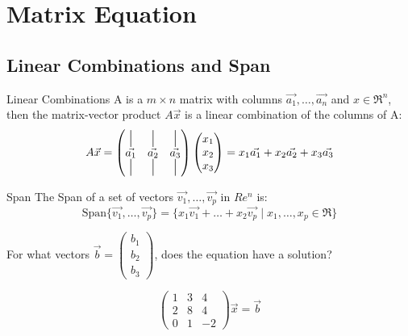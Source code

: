 \section{Matrix Equation}
\subsection{Linear Combinations and Span}
\begin{definition}
    Linear Combinations
    \newline
    A is a \(m\times n\) matrix with columns \(\Vec{a_1}, \dots, \Vec{a_n}\) and \(x\in \Re^n\), then the matrix-vector product \(A\Vec{x}\) is a linear combination of the columns of A:
    \begin{equation}
        A\Vec{x} = 
        \begin{pmatrix}
            \spike{15pt}{$\Vec{a_1}$}  & \spike{15pt}{$\Vec{a_2}$} & \spike{15pt}{$\Vec{a_3}$}
        \end{pmatrix}
        \begin{pmatrix}
            x_1 \\
            x_2 \\
            x_3
        \end{pmatrix} = x_1 \Vec{a_1} + x_2 \Vec{a_2} + x_3 \Vec{a_3}
    \end{equation}
\end{definition}

\begin{definition}
    Span 
    \newline
    The Span of a set of vectors \(\Vec{v_1}, \dots, \Vec{v_p}\) in \(Re^n\) is: \[\text{Span}\{\Vec{v_1}, \dots, \Vec{v_p}\} = \{x_1 \Vec{v_1} + \dots + x_2 \Vec{v_p} \; | \; x_1, \dots, x_p \in \Re\}\]
\end{definition}

\noindent
For what vectors \(\Vec{b} = \begin{pmatrix}
    b_1 \\ b_2 \\ b_3
\end{pmatrix}\), does the equation have a solution?

\begin{equation}
    \begin{pmatrix}
        1 & 3 & 4 \\
        2 & 8 & 4 \\
        0 & 1 & -2
    \end{pmatrix}
    \Vec{x} = \Vec{b}
\end{equation}

